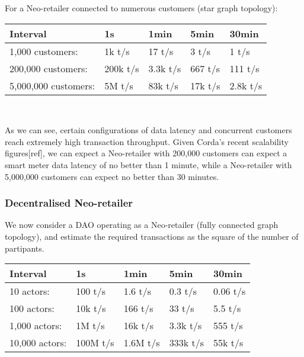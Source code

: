 \documentclass{article}
\newcommand{\head}[1]{\textnormal{\textbf{#1}}}
\theoremstyle{definition}
\theoremstyle{plain} %
\begin{document}
For a Neo-retailer connected to numerous customers (star graph topology): \\

\begin{tabular}{|l|l|l|l|l|}
 \hline 	
 \head{Interval} 		& \head{1s} & \head{1min} & \head{5min} & \head{30min}\\
 \hline 
 \hline
 
 1,000 customers:		& 1k t/s	& 17 t/s	& 3 t/s		& 1 t/s \\
 200,000 customers:		& 200k t/s	& 3.3k t/s	& 667 t/s	& 111 t/s \\
 5,000,000 customers:	& 5M t/s	& 83k t/s	& 17k t/s	& 2.8k t/s \\
 \hline
 
\end{tabular} \\
\vspace{2mm}

\noindent As we can see, certain configurations of data latency and concurrent customers reach extremely high transaction throughput. Given Corda's recent scalability figures[ref], we can expect a Neo-retailer with 200,000 customers can expect a smart meter data latency of no better than 1 minute, while a Neo-retailer with 5,000,000 customers can expect no better than 30 minutes.

\subsubsection{Decentralised Neo-retailer}

We now consider a DAO operating as a Neo-retailer (fully connected graph topology), and estimate the required transactions as the square of the number of partipants. \\

\begin{tabular}{|l|l|l|l|l|}
 \hline 	
 \head{Interval} 		& \head{1s} & \head{1min} & \head{5min} & \head{30min}\\
 \hline 
 \hline
 
 10 actors:		& 100 t/s	& 1.6 t/s	& 0.3 t/s	& 0.06 t/s \\
 100 actors:	& 10k t/s	& 166 t/s	& 33 t/s	& 5.5 t/s \\
 1,000 actors:	& 1M t/s	& 16k t/s	& 3.3k t/s	& 555 t/s \\
 10,000 actors:	& 100M t/s	& 1.6M t/s	& 333k t/s	& 55k t/s \\
 \hline
 
\end{tabular} \\
\vspace{2mm}
\end{document}
